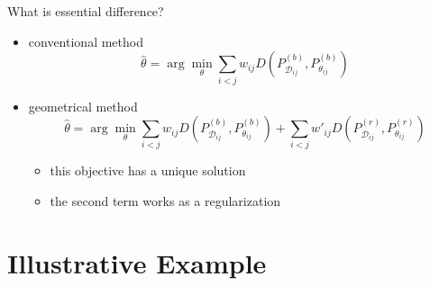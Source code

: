 \documentclass[fleqn,aspectratio=1610]{beamer}
\begin{document}
\begin{frame}[label={sec:org0d7252f}]{What is essential difference?}
\begin{itemize}
\item conventional method
\begin{equation}
  \hat\theta
  =\arg\min_{\theta}
  \sum_{i<j} w_{ij}D(P_{\mathcal{D}_{ij}}^{(b)},P_{\theta_{ij}}^{(b)})
\end{equation}
\item geometrical method
\begin{equation}
  \hat\theta
  =\arg\min_{\theta}
  \sum_{i<j}w_{ij}D(P_{\mathcal{D}_{ij}}^{(b)},P_{\theta_{ij}}^{(b)})
  +\sum_{i<j}w'_{ij}D(P_{\mathcal{D}_{ij}}^{(r)},P_{\theta_{ij}}^{(r)})
\end{equation}
\begin{itemize}
\item this objective has a unique solution
\item the second term works as a regularization
\end{itemize}
\end{itemize}
\end{frame}


\section{Illustrative Example}
\label{sec:org2ca4699}
\end{document}
